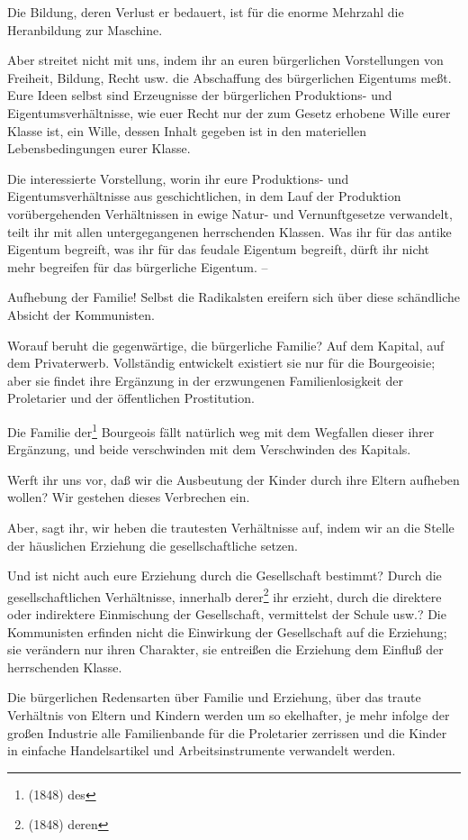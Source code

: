 \documentclass[letterpaper]{article}
\begin{document}
Die Bildung, deren Verlust er bedauert, ist für die enorme Mehrzahl die Heranbildung zur Maschine.

Aber streitet nicht mit uns, indem ihr an euren bürgerlichen Vorstellungen von Freiheit, Bildung, Recht usw. die Abschaffung des bürgerlichen Eigentums meßt. Eure Ideen selbst sind Erzeugnisse der bürgerlichen Produktions- und Eigentumsverhältnisse, wie euer Recht nur der zum Gesetz erhobene Wille eurer Klasse ist, ein Wille, dessen Inhalt gegeben ist in den materiellen Lebensbedingungen eurer Klasse.

Die interessierte Vorstellung, worin ihr eure Produktions- und Eigentumsverhältnisse aus geschichtlichen, in dem Lauf der Produktion vorübergehenden Verhältnissen in ewige Natur- und Vernunftgesetze verwandelt, teilt ihr mit allen untergegangenen herrschenden Klassen. Was ihr für das antike Eigentum begreift, was ihr für das feudale Eigentum begreift, dürft ihr nicht mehr begreifen für das bürgerliche Eigentum. –

Aufhebung der Familie! Selbst die Radikalsten ereifern sich über diese schändliche Absicht der Kommunisten.

Worauf beruht die gegenwärtige, die bürgerliche Familie? Auf dem Kapital, auf dem Privaterwerb. Vollständig entwickelt existiert sie nur für die Bourgeoisie; aber sie findet ihre Ergänzung in der erzwungenen Familienlosigkeit der Proletarier und der öffentlichen Prostitution.

Die Familie der\footnote{(1848) des} Bourgeois fällt natürlich weg mit dem Wegfallen dieser ihrer Ergänzung, und beide verschwinden mit dem Verschwinden des Kapitals.

Werft ihr uns vor, daß wir die Ausbeutung der Kinder durch ihre Eltern aufheben wollen? Wir gestehen dieses Verbrechen ein.

Aber, sagt ihr, wir heben die trautesten Verhältnisse auf, indem wir an die Stelle der häuslichen Erziehung die gesellschaftliche setzen.

Und ist nicht auch eure Erziehung durch die Gesellschaft bestimmt? Durch die gesellschaftlichen Verhältnisse, innerhalb derer\footnote{(1848) deren} ihr erzieht, durch die direktere oder indirektere Einmischung der Gesellschaft, vermittelst der Schule usw.? Die Kommunisten erfinden nicht die Einwirkung der Gesellschaft auf die Erziehung; sie verändern nur ihren Charakter, sie entreißen die Erziehung dem Einfluß der herrschenden Klasse.

Die bürgerlichen Redensarten über Familie und Erziehung, über das traute Verhältnis von Eltern und Kindern werden um so ekelhafter, je mehr infolge der großen Industrie alle Familienbande für die Proletarier zerrissen und die Kinder in einfache Handelsartikel und Arbeitsinstrumente verwandelt werden.
\end{document}

